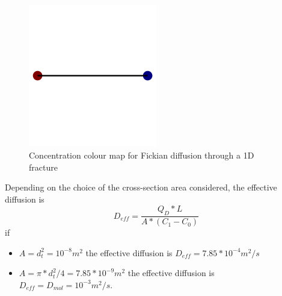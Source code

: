 \documentclass{article}
\begin{document}
\begin{figure}[h]
    \centering
    \includegraphics[width=0.5\textwidth]{images/fromOpenPNM/oneFractureSolution.png}
    \caption{Concentration colour map for Fickian diffusion through a 1D fracture}
    \label{fig:OneFractureSolution}
\end{figure}
Depending on the choice of the cross-section area considered, the effective diffusion is
\begin{equation}
    D_{eff}=\frac{Q_D*L}{A*(C_1-C_0)}
    \label{eq:EffDiff1Frac}
\end{equation}
if
\begin{itemize}
    \item $A=d_t^2=10^{-8} m^2$ the effective diffusion is $D_{eff}=7.85*10^{-4} m^2/s$
    \item $A=\pi*d_t^2/4=7.85*10^{-9} m^2$ the effective diffusion is $D_{eff}=D_{mol}=10^{-3} m^2/s$.
\end{itemize}

\FloatBarrier  %
\end{document}
